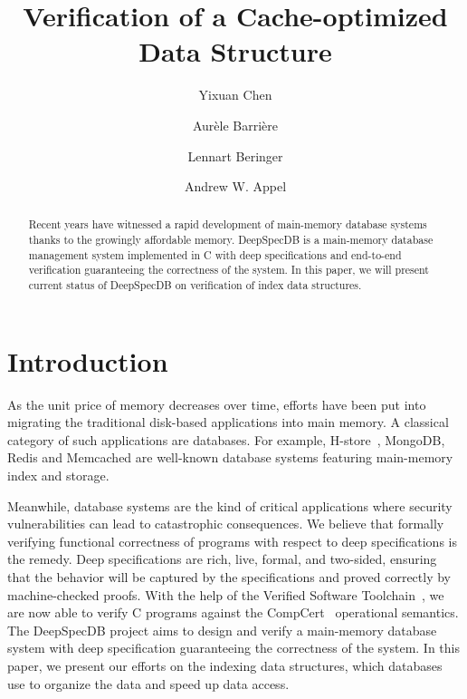 \documentclass[sigplan,review,anonymous]{acmart}\settopmatter{printfolios=true,printccs=false,printacmref=false}
\begin{document}
\title[]{Verification of a Cache-optimized Data Structure}
\author{Yixuan Chen} 

\author{Aur\`ele Barri\`ere}  

\author{Lennart Beringer} 

\author{Andrew W. Appel} 

\begin{abstract}
  Recent years have witnessed a rapid development of main-memory database
  systems thanks to the growingly affordable memory. DeepSpecDB is a main-memory
  database management system implemented in C with deep specifications and
  end-to-end verification guaranteeing the correctness of the system. In this
  paper, we will present current status of DeepSpecDB on verification of index
  data structures.
\end{abstract}


\maketitle

\section{Introduction}

As the unit price of memory decreases over time, efforts have been put into
migrating the traditional disk-based applications into main memory. A classical
category of such applications are databases. For example, H-store~\cite{hstore},
MongoDB, Redis and Memcached are well-known database systems featuring
main-memory index and storage.

Meanwhile, database systems are the kind of critical applications where security
vulnerabilities can lead to catastrophic consequences. We believe that formally
verifying functional correctness of programs with respect to deep specifications
is the remedy. Deep specifications are rich, live, formal, and two-sided,
ensuring that the behavior will be captured by the specifications and proved
correctly by machine-checked proofs. With the help of the Verified Software
Toolchain~\cite{VST}, we are now able to verify C programs against the
CompCert~\cite{compcert} operational semantics. The DeepSpecDB project aims to
design and verify a main-memory database system with deep specification
guaranteeing the correctness of the system. In this paper, we present our
efforts on the indexing data structures, which databases use to organize the
data and speed up data access.
\end{document}

